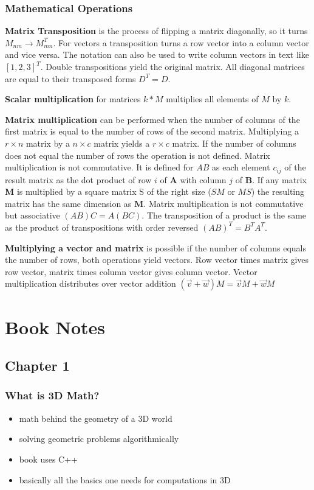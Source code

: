 \documentclass[a4paper,11pt]{amsart}
\begin{document}
\subsubsection{Mathematical Operations}

\textbf{Matrix Transposition} is the process of flipping a matrix diagonally,
so it turns $M_{nm} \rightarrow M^T_{mn}$. For vectors a transposition turns
a row vector into a column vector and vice versa. The notation can also be used
to write column vectors in text like $[1,2,3]^T$. Double transpositions yield
the original matrix. All diagonal matrices are equal to their transposed forms
$D^T = D$.

\textbf{Scalar multiplication} for matrices $k*M$ multiplies all elements of
$M$ by $k$.

\textbf{Matrix multiplication} can be performed when the number of columns of
the first matrix is equal to the number of rows of the second matrix.
Multiplying a $r \times n$ matrix by a $n \times c$ matrix yields a $r \times
c$ matrix. If the number of columns does not equal the number of rows the
operation is not defined. Matrix multiplication is not commutative. It is
defined for $AB$ as each element $c_{ij}$ of the result matrix as the dot product of
row $i$ of \textbf{A} with column $j$ of \textbf{B}. If any matrix \textbf{M}
is multiplied by a square matrix S of the right size ($SM$ or $MS$) the
resulting matrix has the same dimension as \textbf{M}. Matrix multiplication is
not commutative but associative $(AB)C=A(BC)$. The transposition of a product
is the same as the product of transpositions with order reversed
$(AB)^T=B^TA^T$.

\textbf{Multiplying a vector and matrix} is possible if the number of columns
equals the number of rows, both operations yield vectors. Row vector times
matrix gives row vector, matrix times column vector gives column vector. Vector
multiplication distributes over vector addition $(\vec v + \vec w)M = \vec
v M + \vec w M$

\section{Book Notes}

\subsection{Chapter 1}

\subsubsection{What is 3D Math?}
\begin{itemize}
    \item math behind the geometry of a 3D world
    \item solving geometric problems algorithmically
    \item book uses C++
    \item basically all the basics one needs for computations in 3D
\end{itemize}
\end{document}
